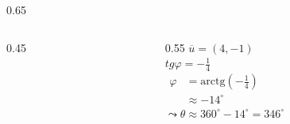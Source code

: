 \documentclass{beamer}
\begin{document}
\begin{frame}{}
\begin{columns}[c]
\begin{column}{0.65\textwidth}
\begin{columns}[c]
\begin{column}{0.45\textwidth}
\begin{center}
					\end{center}
				\end{column}
				\begin{column}{0.55\textwidth}
					$\overline{u} = (4,-1)$ \\
					\vspace{0.2cm}
					$\displaystyle tg \varphi = -\frac{1}{4}$ \\
					\vspace{0.2cm}
					$\begin{aligned}
						\varphi &= \text{arctg}\left(-\frac{1}{4}\right) \\
						&\approx -14^\circ
					\end{aligned}$ \\
					\vspace{0.2cm}
					$\leadsto \theta \approx 360^\circ - 14^\circ = 346^\circ$
				\end{column}
			\end{columns}
		\end{column}
	\end{columns}
	
\end{frame}
\end{document}
